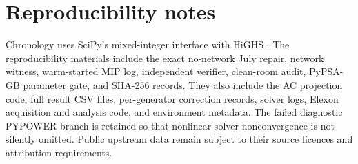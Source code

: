 \documentclass[10pt,journal,onecolumn]{IEEEtran}
\begin{document}
\section{Reproducibility notes}
Chronology uses SciPy's mixed-integer interface with HiGHS \cite{Virtanen2020,Huangfu2018}. The reproducibility materials include the exact no-network July repair, network witness, warm-started MIP log, independent verifier, clean-room audit, PyPSA-GB parameter gate, and SHA-256 records. They also include the AC projection code, full result CSV files, per-generator correction records, solver logs, Elexon acquisition and analysis code, and environment metadata. The failed diagnostic PYPOWER branch is retained so that nonlinear solver nonconvergence is not silently omitted. Public upstream data remain subject to their source licences and attribution requirements.


\end{document}
